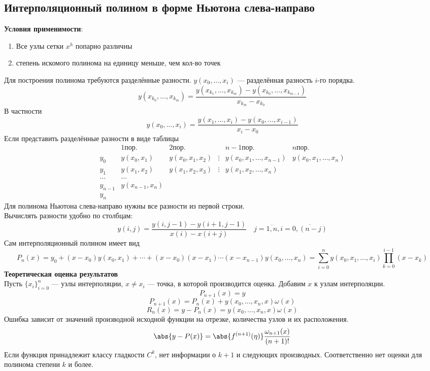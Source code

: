 \documentclass[a4paper]{article}
\begin{document}
\subsection{Интерполяционный полином в форме Ньютона слева-направо}\label{subsec:Newton}
\textbf{Условия применимости}:
\begin{enumerate}
\item\label{item:3} Все узлы сетки \(x^{h}\) попарно различны
  \item степень искомого полинома на единицу меньше, чем кол-во точек
\end{enumerate}
Для построения полинома требуются разделённые разности. \(y(x_0,\ldots,x_{i})\) --- разделённая разность \(i\)-го порядка. \[
  y(x_{k_{0}},\ldots,x_{k_{m}}) = \frac{y(x_{k_{1}},\ldots,x_{k_{m}}) - y(x_{k_{0}},\ldots,x_{k_{m-1}})}{x_{k_{m}}-x_{k_{0}}}
\]В частности \[
  y(x_{0},\ldots,x_{i}) = \frac{y(x_{1},\ldots,x_{i})-y(x_{0},\ldots,x_{i-1})}{x_{i}-x_{0}}
\]
Если представить разделённые разности в виде таблицы \[
  \begin{matrix}
    & 1 \text{пор.} & 2 \text{пор.} & & n-1 \text{пор.} & n \text{пор.} \\
    y_0 & y(x_0,x_1) & y(x_0,x_1,x_2) & \vdots & y(x_0,x_1,\ldots,x_{n-1}) & y(x_0,x_1,\ldots,x_{n})\\
    y_1 & y(x_1,x_2) & y(x_1,x_2,x_3) & \vdots & y(x_1,x_2,\ldots,x_{n}) \\
    \ldots & \ldots \\
    y_{n-1} & y(x_{n-1},x_{n})\\
    y_{n}
  \end{matrix}
\]
Для полинома Ньютона слева-направо нужны все разности из первой строки.\\
Вычислять разности удобно по столбцам: \[
  y(i,j) = \frac{y(i,j-1)-y(i+1,j-1)}{x(i)-x(i+j)} \quad j = \overline{1,n}, i = \overline{0,(n-j)}
\]
Сам интерполяционный полином имеет вид \[
  P_{n}(x) = y_0 + (x-x_0)y(x_0,x_1)+\cdots+(x-x_0)(x-x_1)\cdots(x-x_{n-1})y(x_0,\ldots,x_{n}) = \sum_{i=0}^n y(x_0,x_1,\ldots,x_{i}) \prod_{k=0}^{i-1} (x-x_{k})
\]
\textbf{Теоретическая оценка результатов}\\
Пусть \(\{x_{i}\}_{i=0}^{n}\) --- узлы интерполяции, \(x \neq x_{i}\) --- точка, в которой производится оценка. Добавим \(x\) к
узлам интерполяции. \[
  P_{n+1}(x) = y
\]\[
  P_{n+1}(x) = P_{n}(x) + y(x_0,\ldots,x_{n},x)\omega(x)
\]\[
  R_{n}(x) = y-P_{n}(x) = y(x_0,\ldots,x_{n},x)\omega(x)
\]
Ошибка зависит от значений производной исходной функции на отрезке, количества узлов и их расположения. \[
  \abs{y - P(x)} = \abs{f^{(n+1)}(\eta)} \frac{\omega_{n+1}(x)}{(n+1)!}
\]
Если функция принадлежит классу гладкости \(C^{k}\), нет информации о \(k+1\) и следующих производных. Соответственно
нет оценки для полинома степени \(k\) и более.
\end{document}
